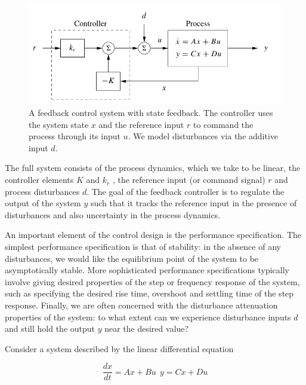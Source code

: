 \begin{figure}[!htb]
\begin{center}
\includegraphics[scale=0.280]{img/state_feedback/state_feedback_sys.jpeg}
\end{center}
\caption{A feedback control system with state feedback. The controller uses the system
state $x$ and the reference input $r$ to command the process through its input $u$. We model
disturbances via the additive input $d$.}
\label{state_feedback_sys_II}
\end{figure}

The full system consists of the process dynamics, which we take to be linear, the controller
elements $K$ and $k_r$ , the reference input (or command signal) $r$ and process disturbances $d$. The goal of the feedback controller is to regulate the output of the system $y$ such that it tracks the reference input in the presence of disturbances and also uncertainty in the process dynamics.

An important element of the control design is the performance specification.
The simplest performance specification is that of stability: in the absence of any
disturbances, we would like the equilibrium point of the system to be asymptotically
stable. More sophisticated performance specifications typically involve giving desired properties of the step or frequency response of the system, such as specifying the desired rise time, overshoot and settling time of the step response. Finally, we are often concerned with the disturbance attenuation properties of the system: to
what extent can we experience disturbance inputs $d$ and still hold the output $y$ near the desired value?

Consider a system described by the linear differential equation



\begin{equation}
\frac{dx}{dt} = Ax + Bu ~~ y = Cx + Du
\end{equation}






